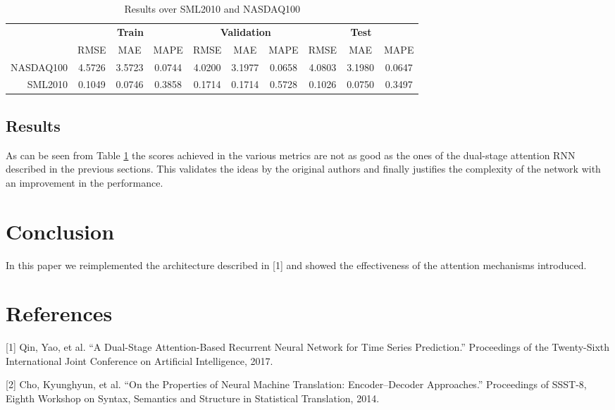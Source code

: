 \documentclass{article}
\begin{document}
\begin{center}
\begin{table}[h]
\begin{tabular}{r|c|c|c|c|c|c|c|c|c|}
\multicolumn{1}{r}{}
  & \multicolumn{3}{c}{\textbf{Train}}
  & \multicolumn{3}{c}{\textbf{Validation}}
  & \multicolumn{3}{c}{\textbf{Test}} \\
  \cline{2-10}
  & \multicolumn{1}{c}{RMSE}
  & \multicolumn{1}{c}{MAE}
  & \multicolumn{1}{c|}{MAPE}
  & \multicolumn{1}{c}{RMSE}
  & \multicolumn{1}{c}{MAE}
  & \multicolumn{1}{c|}{MAPE}
  & \multicolumn{1}{c}{RMSE}
  & \multicolumn{1}{c}{MAE}
  & \multicolumn{1}{c|}{MAPE}\\
\cline{2-10}
NASDAQ100 & 4.5726 & 3.5723 & 0.0744 & 4.0200 & 3.1977 & 0.0658 & 4.0803 &
3.1980 & 0.0647 \\
\cline{2-10}
SML2010 & 0.1049 & 0.0746 & 0.3858 & 0.1714 & 0.1714 & 0.5728 & 0.1026 & 0.0750
& 0.3497 \\
\cline{2-10}
\end{tabular}
\vspace{1em}
\caption{Results over SML2010 and NASDAQ100}
\label{results-encoder}
\end{table}
\end{center}




\subsection{Results}

As can be seen from Table \ref{results-encoder} the scores achieved in the various
metrics are not as good as the ones of the dual-stage attention RNN described
in the previous sections. This validates the ideas by the original authors and
finally justifies the complexity of the network with an improvement in the 
performance.



\section{Conclusion}

In this paper we reimplemented the architecture described in [1] and showed
the effectiveness of the attention mechanisms introduced.



\newpage
\section*{References}
[1] Qin, Yao, et al. “A Dual-Stage Attention-Based Recurrent Neural Network for
Time Series Prediction.” Proceedings of the Twenty-Sixth International Joint
Conference on Artificial Intelligence, 2017.

[2] Cho, Kyunghyun, et al. “On the Properties of Neural Machine Translation:
Encoder–Decoder Approaches.” Proceedings of SSST-8, Eighth Workshop on Syntax,
Semantics and Structure in Statistical Translation, 2014.
\end{document}
